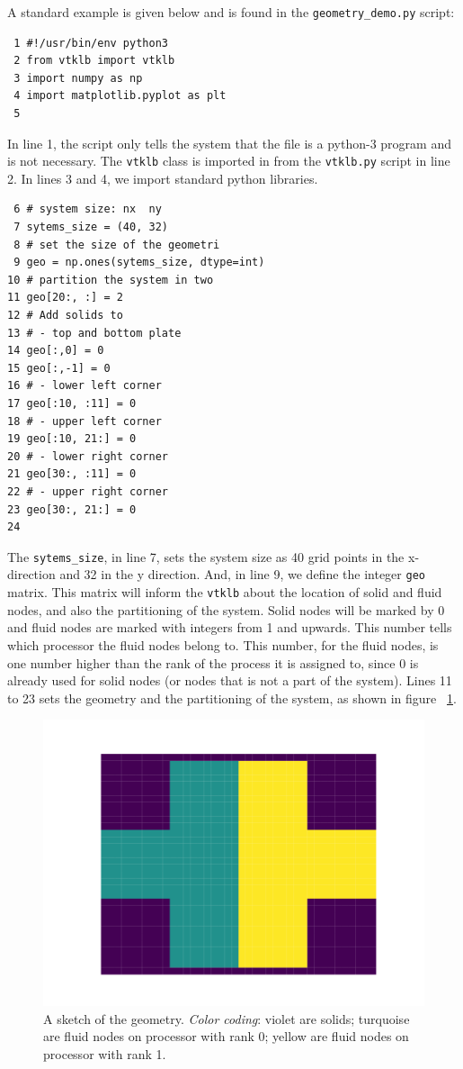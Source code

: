 \documentclass[11pt,a4paper]{report}
\begin{document}
A standard example is given below and is found in the \texttt{geometry\_demo.py} script: 
\begin{verbatim}
 1 #!/usr/bin/env python3
 2 from vtklb import vtklb
 3 import numpy as np
 4 import matplotlib.pyplot as plt
 5
\end{verbatim}
In line 1, the script only tells the system that the file is a python-3 program and is not necessary. The \texttt{vtklb} class is imported in from the \texttt{vtklb.py} script in line 2.  In lines 3 and 4, we import standard python libraries. 
\begin{verbatim} 
 6 # system size: nx  ny
 7 sytems_size = (40, 32)
 8 # set the size of the geometri
 9 geo = np.ones(sytems_size, dtype=int)
10 # partition the system in two
11 geo[20:, :] = 2
12 # Add solids to
13 # - top and bottom plate
14 geo[:,0] = 0
15 geo[:,-1] = 0
16 # - lower left corner
17 geo[:10, :11] = 0
18 # - upper left corner
19 geo[:10, 21:] = 0
20 # - lower right corner
21 geo[30:, :11] = 0
22 # - upper right corner
23 geo[30:, 21:] = 0
24
\end{verbatim}
The \texttt{sytems\_size}, in line 7, sets the system size as 40 grid points in the x-direction and 32 in the y direction. And, in line 9, we define the integer \texttt{geo} matrix. This matrix will inform the \texttt{vtklb} about the location of solid and fluid nodes, and also the partitioning of the system. Solid nodes will be marked by 0 and fluid nodes are marked with integers from 1 and upwards. This number tells which processor the fluid nodes belong to. This number, for the fluid nodes, is one number higher than the rank of the process it is assigned to, since 0 is already used for solid nodes (or nodes that is not a part of the system). Lines 11 to 23 sets the geometry and the partitioning of the system, as shown in figure ~\ref{fig:std_geo}.
\begin{figure}
	\centering
	\includegraphics[width=0.7\linewidth]{Figures/std_geo.pdf}
	\caption{A sketch of the geometry. \textit{Color coding}: violet are solids; turquoise are fluid nodes on processor with rank 0; yellow are fluid nodes on processor with rank 1.}
	\label{fig:std_geo}
\end{figure} 
\end{document}
